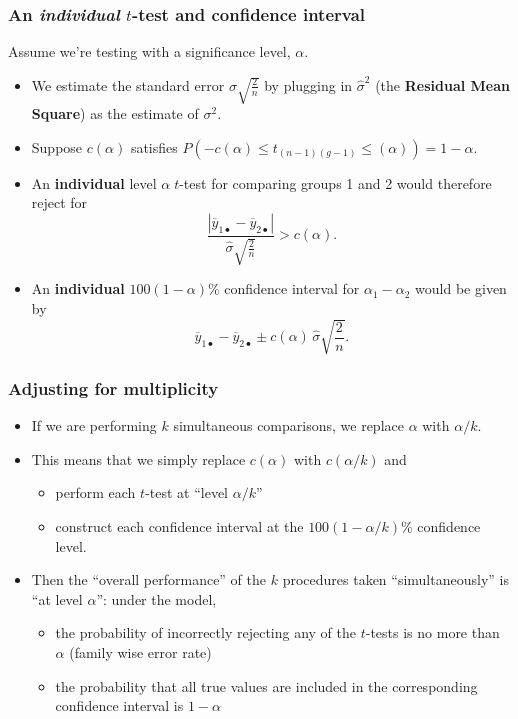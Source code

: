 \documentclass[a4paper]{article}
\begin{document}
\subsubsection{An \textit{individual} \( t \)-test and confidence interval}
Assume we're testing with a significance level, \( \alpha \).
\begin{itemize}
	\item We estimate the standard error \( \sigma \sqrt{\frac{2}{n}} \) by plugging in \( \hat{\sigma}^{2} \) (the \textbf{Residual Mean Square}) as the estimate of \( \sigma^{2} \).
	\item Suppose \( c(\alpha) \) satisfies \( P(-c(\alpha) \leq t_{(n-1)(g-1)} \leq(\alpha)) = 1 - \alpha \).
	\item An \textbf{individual} level \( \alpha\;t \)-test for comparing groups 1 and 2 would therefore reject for
	\[
		\frac{|\overline y_{1\bullet}-\overline y_{2\bullet}|}{\hat{\sigma}\sqrt{\frac{2}{n}}}>c(\alpha).
	\]
	\item An \textbf{individual} \( 100(1-\alpha)\% \) confidence interval for \( \alpha_1 - \alpha_2 \) would be given by
	\[
		\overline y_{1\bullet}-\overline y_{2\bullet}\pm c(\alpha)\,\hat{\sigma}\sqrt{\frac{2}{n}}.
	\]
\end{itemize}
\subsubsection{Adjusting for multiplicity}
\begin{itemize}
	\item If we are performing \( k \) simultaneous comparisons, we replace \( \alpha \) with \( \alpha / k \).
	\item This means that we simply replace \( c(\alpha) \) with \( c(\alpha / k) \) and
	\begin{itemize}
		\item perform each \( t \)-test at ``level \( \alpha / k \)''
		\item construct each confidence interval at the \( 100(1-\alpha / k)\% \) confidence level.
	\end{itemize}
	\item Then the ``overall performance'' of the \( k \) procedures taken ``simultaneously'' is ``at level 
	\( \alpha \)'': under the model,
	\begin{itemize}
		\item the probability of incorrectly rejecting any of the \( t \)-tests is no more than \( \alpha \)  (family wise error rate)
		\item the probability that all true values are included in the corresponding confidence interval is \( 1-\alpha \) 
	\end{itemize}
\end{itemize}
\end{document}
